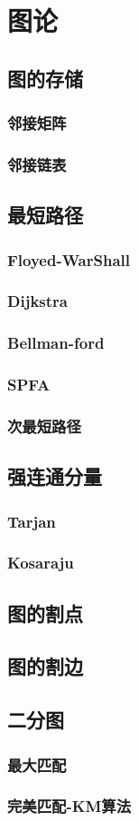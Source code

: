 \section{图论}

\subsection{图的存储}
\subsubsection{邻接矩阵}
\subsubsection{邻接链表}
\subsection{最短路径}

\subsubsection{Floyed-WarShall}
\subsubsection{Dijkstra}
\subsubsection{Bellman-ford}
\subsubsection{SPFA} 
\subsubsection{次最短路径} 

\subsection{强连通分量}
\subsubsection{Tarjan} 
\subsubsection{Kosaraju}

\subsection{图的割点}
\subsection{图的割边}

\subsection{二分图}
\subsubsection{最大匹配}
\subsubsection{完美匹配-KM算法}
